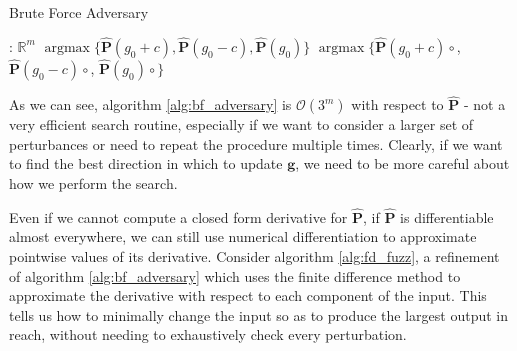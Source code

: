 \documentclass[12pt,initial,twoside,maitrise]{dms}
\numberwithin{equation}{section}
\numberwithin{table}{chapter}
\numberwithin{figure}{chapter}
\begin{document}
\begin{algorithm}[H]
\caption{Brute Force Adversary}
\label{alg:bf_adversary}
\begin{algorithmic}[1]
: $\mathbb{R}^m$
 
\State \Return $\operatorname{argmax}\{\mathbf{\hat P}(g_0 + c), \mathbf{\hat P}(g_0 - c), \mathbf{\hat P}(g_0)\}$
\Else {}
\State \Return $\operatorname{argmax}\{\mathbf{\hat P}(g_0 + c) \circ$,\newline
\hspace*{10em} $\mathbf{\hat P}(g_0 - c)\circ$,\newline
\hspace*{10em} $\mathbf{\hat P}(g_0)\circ$$\}$
\EndIf
\EndProcedure
\end{algorithmic}
\end{algorithm}

As we can see, algorithm \autoref{alg:bf_adversary} is $\mathcal{O}(3^m)$ with respect to $\mathbf{\hat P}$ - not a very efficient search routine, especially if we want to consider a larger set of perturbances or need to repeat the procedure multiple times. Clearly, if we want to find the best direction in which to update $\mathbf g$, we need to be more careful about how we perform the search.

Even if we cannot compute a closed form derivative for $\mathbf{\hat P}$, if $\mathbf{\hat P}$ is differentiable almost everywhere, we can still use numerical differentiation to approximate pointwise values of its derivative. Consider algorithm \autoref{alg:fd_fuzz}, a refinement of algorithm \autoref{alg:bf_adversary} which uses the finite difference method to approximate the derivative with respect to each component of the input. This tells us how to minimally change the input so as to produce the largest output in reach, without needing to exhaustively check every perturbation.
\end{document}
